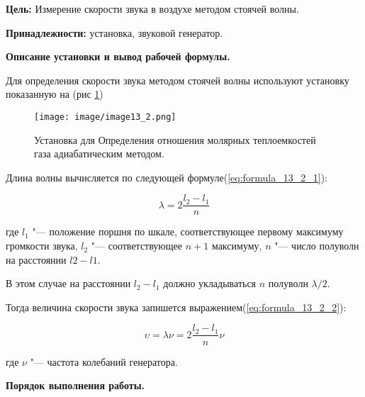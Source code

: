 \textbf{Цель:} Измерение скорости звука в воздухе методом стоячей волны.

\textbf{Принадлежности:} установка, звуковой генератор.

\begin{center}
    \textbf{Описание установки и вывод рабочей формулы.}
\end{center}

Для определения скорости звука методом стоячей волны используют установку показанную на (рис \ref{fig:установка_13_2})

\begin{figure}[!h]
    \centering
    \texttt{[image: image/image13\_2.png]}
    \caption{Установка для Определения отношения молярных теплоемкостей газа адиабатическим методом.}
    \label{fig:установка_13_2}
\end{figure}

Длина волны вычисляется по следующей формуле(\ref{eq:formula_13_2_1}):

\begin{equation}
    \lambda = 2 \frac{l_2 - l_1}{n}
    \label{eq:formula_13_2_1}
\end{equation}

где $l_1$ "--- положение поршня по шкале, соответствующее первому максимуму громкости звука, $l_2$ "--- соответствующее $n+1$ максимуму, $n$ "--- число полуволн на расстоянии $l2-l1$.

В этом случае на расстоянии $l_2 - l_1$ должно укладываться $n$ полуволн  $\lambda / 2$.

Тогда величина скорости звука запишется выражением(\ref{eq:formula_13_2_2}):

\begin{equation}
    \upsilon = \lambda \nu = 2 \frac{l_2 - l_1}{n} \nu
    \label{eq:formula_13_2_2}
\end{equation}

где $\nu$ "--- частота колебаний генератора.

\begin{center}
    \textbf{Порядок выполнения работы.}
\end{center}

